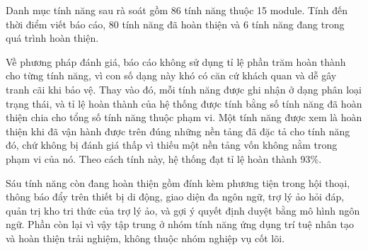 \documentclass[12pt,a4paper,oneside]{report}
\begin{document}
Danh mục tính năng sau rà soát gồm 86 tính năng thuộc 15 module. Tính đến thời điểm viết báo cáo, 80 tính năng đã hoàn thiện và 6 tính năng đang trong quá trình hoàn thiện.

Về phương pháp đánh giá, báo cáo không sử dụng tỉ lệ phần trăm hoàn thành cho từng tính năng, vì con số dạng này khó có căn cứ khách quan và dễ gây tranh cãi khi bảo vệ. Thay vào đó, mỗi tính năng được ghi nhận ở dạng phân loại trạng thái, và tỉ lệ hoàn thành của hệ thống được tính bằng số tính năng đã hoàn thiện chia cho tổng số tính năng thuộc phạm vi. Một tính năng được xem là hoàn thiện khi đã vận hành được trên đúng những nền tảng đã đặc tả cho tính năng đó, chứ không bị đánh giá thấp vì thiếu một nền tảng vốn không nằm trong phạm vi của nó. Theo cách tính này, hệ thống đạt tỉ lệ hoàn thành 93\%.

Sáu tính năng còn đang hoàn thiện gồm đính kèm phương tiện trong hội thoại, thông báo đẩy trên thiết bị di động, giao diện đa ngôn ngữ, trợ lý ảo hỏi đáp, quản trị kho tri thức của trợ lý ảo, và gợi ý quyết định duyệt bằng mô hình ngôn ngữ. Phần còn lại vì vậy tập trung ở nhóm tính năng ứng dụng trí tuệ nhân tạo và hoàn thiện trải nghiệm, không thuộc nhóm nghiệp vụ cốt lõi.
\end{document}
